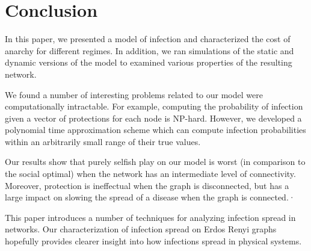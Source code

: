 \section{Conclusion}

In this paper, we presented a model of infection and characterized the cost of anarchy for different regimes. In addition, we ran simulations of the static and dynamic versions of the model to examined various properties of the resulting network.

We found a number of interesting problems related to our model were computationally intractable. For example, computing the probability of infection given a vector of protections for each node is NP-hard. However, we developed a polynomial time approximation scheme which can compute infection probabilities within an arbitrarily small range of their true values.

Our results show that purely selfish play on our model is worst (in comparison to the social optimal) when the network has an intermediate level of connectivity. Moreover, protection is ineffectual when the graph is disconnected, but has a large impact on slowing the spread of a disease when the graph is connected.·

This paper introduces a number of techniques for analyzing infection spread in networks. Our characterization of infection spread on Erdos Renyi graphs hopefully provides clearer insight into how infections spread in physical systems.

